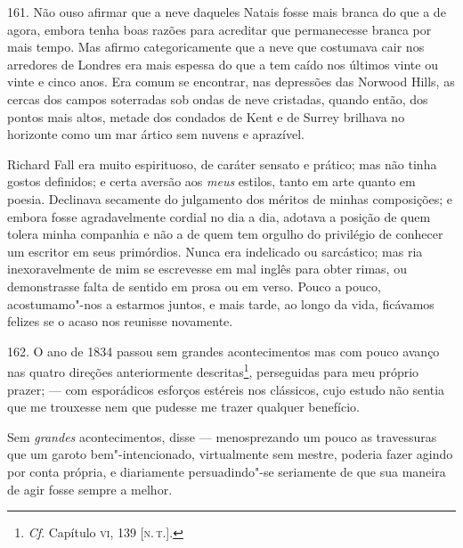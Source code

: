 161. Não ouso afirmar que a neve daqueles Natais fosse mais branca do
que a de agora, embora tenha boas razões para acreditar que permanecesse
branca por mais tempo. Mas afirmo categoricamente que a neve que
costumava cair nos arredores de Londres era mais espessa do que a tem
caído nos últimos vinte ou vinte e cinco anos. Era comum se encontrar,
nas depressões das Norwood Hills, as cercas dos campos soterradas sob
ondas de neve cristadas, quando então, dos pontos mais altos, metade dos
condados de Kent e de Surrey brilhava no horizonte como um mar ártico
sem nuvens e aprazível.

Richard Fall era muito espirituoso, de caráter sensato e prático; mas
não tinha gostos definidos; e certa aversão aos \emph{meus} estilos,
tanto em arte quanto em poesia. Declinava secamente do julgamento dos
méritos de minhas composições; e embora fosse agradavelmente cordial no
dia a dia, adotava a posição de quem tolera minha companhia e não a de
quem tem orgulho do privilégio de conhecer um escritor em seus
primórdios. Nunca era indelicado ou sarcástico; mas ria inexoravelmente
de mim se escrevesse em mal inglês para obter rimas, ou demonstrasse
falta de sentido em prosa ou em verso. Pouco a pouco, acostumamo"-nos a
estarmos juntos, e mais tarde, ao longo da vida, ficávamos felizes se o
acaso nos reunisse novamente.

162. O ano de 1834 passou sem grandes acontecimentos mas com pouco
avanço nas quatro direções anteriormente descritas\footnote{\emph{Cf}.
  Capítulo \textsc{vi}, 139 {[}\textsc{n.\,t.}{]}.}, perseguidas para meu próprio
prazer; --- com esporádicos esforços estéreis nos clássicos, cujo estudo
não sentia que me trouxesse nem que pudesse me trazer qualquer
benefício.

Sem \emph{grandes} acontecimentos, disse --- menosprezando um pouco as
travessuras que um garoto bem"-intencionado, virtualmente sem mestre,
poderia fazer agindo por conta própria, e diariamente persuadindo"-se
seriamente de que sua maneira de agir fosse sempre a melhor.

